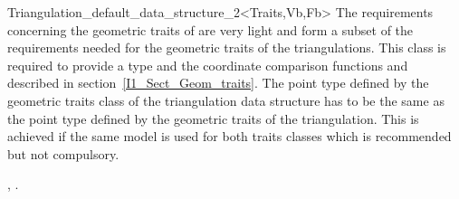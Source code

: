 \begin{ccRefClass}{Triangulation_default_data_structure_2<Traits,Vb,Fb>}
The requirements concerning the geometric traits  of
 are very light and form a subset of the requirements needed
for the geometric traits of the triangulations. 
This class is required  to provide a type 
and the coordinate comparison functions  and
described in section~\ref{I1_Sect_Geom_traits}. The point type
defined by the geometric traits class of the triangulation data structure
has to be the same 
as the point type defined by the geometric traits of the triangulation.
This is achieved if the same model is used for both traits classes
which is recommended but not compulsory.



\ccIsModel



\ccSeeAlso

,
.


\end{ccRefClass}


